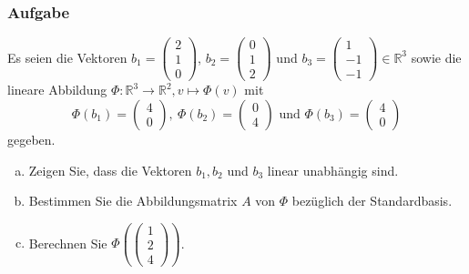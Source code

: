 \documentclass[a4paper,11pt]{scrartcl}
\newcounter{auf}
\newcommand{\Aufgabe}%
        {\addtocounter{auf}{1} \subsubsection*{\rmfamily  Aufgabe \theauf \hspace{1em}} }
\newcommand{\RR}{\mathbb{R}}
\begin{document}
\newpage
\Aufgabe

Es seien die Vektoren $b_1=\begin{pmatrix} 2\\1\\0\end{pmatrix}$, $b_2=\begin{pmatrix} 0\\1\\2\end{pmatrix}$ und $b_3=\begin{pmatrix} 1\\-1\\-1\end{pmatrix} \in \RR^3$ sowie die lineare Abbildung 
$
\Phi: \RR^3 \to \RR^2, v \mapsto \Phi(v)
$
mit 
$$
\Phi(b_1)=\begin{pmatrix} 4\\0\end{pmatrix}, \ \Phi(b_2)=\begin{pmatrix} 0\\4\end{pmatrix} \text{ und } \Phi(b_3)=\begin{pmatrix} 4\\0\end{pmatrix}
$$
gegeben.

\begin{enumerate}[a)]

\item Zeigen Sie, dass die Vektoren $b_1,b_2$ und $b_3$ linear unabhängig sind.
\item Bestimmen Sie die Abbildungsmatrix $A$ von $\Phi$ bezüglich der Standardbasis.
\item Berechnen Sie $\Phi(\begin{pmatrix} 1\\2\\4 \end{pmatrix})$.

\end{enumerate}
%
%
\end{document}
